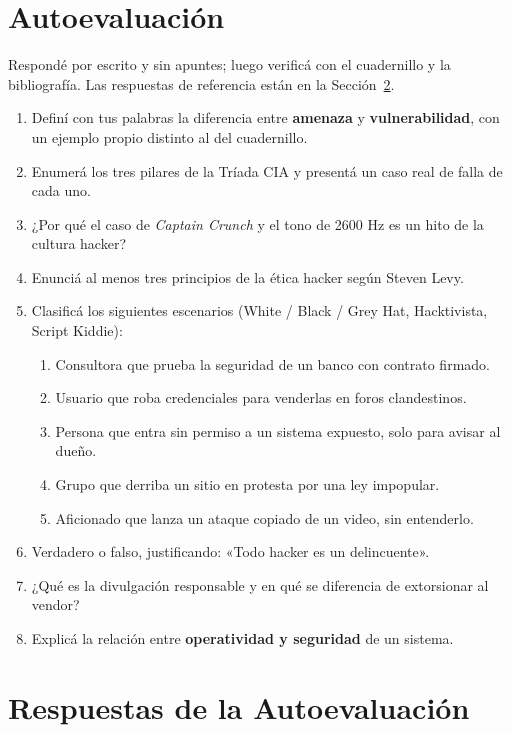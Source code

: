\documentclass[11pt,a4paper]{article}
\begin{document}
\section{Autoevaluación}\label{sec:autoeval}
Respondé por escrito y sin apuntes; luego verificá con el cuadernillo y la bibliografía. Las respuestas de referencia están en la Sección~\ref{sec:respuestas}.

\begin{enumerate}[leftmargin=*]
  \item Definí con tus palabras la diferencia entre \textbf{amenaza} y \textbf{vulnerabilidad}, con un ejemplo propio distinto al del cuadernillo.
  \item Enumerá los tres pilares de la Tríada CIA y presentá un caso real de falla de cada uno.
  \item ¿Por qué el caso de \textit{Captain Crunch} y el tono de 2600 Hz es un hito de la cultura hacker?
  \item Enunciá al menos tres principios de la ética hacker según Steven Levy.
  \item Clasificá los siguientes escenarios (White / Black / Grey Hat, Hacktivista, Script Kiddie):
  \begin{enumerate}
    \item Consultora que prueba la seguridad de un banco con contrato firmado.
    \item Usuario que roba credenciales para venderlas en foros clandestinos.
    \item Persona que entra sin permiso a un sistema expuesto, solo para avisar al dueño.
    \item Grupo que derriba un sitio en protesta por una ley impopular.
    \item Aficionado que lanza un ataque copiado de un video, sin entenderlo.
  \end{enumerate}
  \item Verdadero o falso, justificando: «Todo hacker es un delincuente».
  \item ¿Qué es la divulgación responsable y en qué se diferencia de extorsionar al vendor?
  \item Explicá la relación entre \textbf{operatividad y seguridad} de un sistema.
\end{enumerate}

\section{Respuestas de la Autoevaluación}\label{sec:respuestas}
\end{document}
